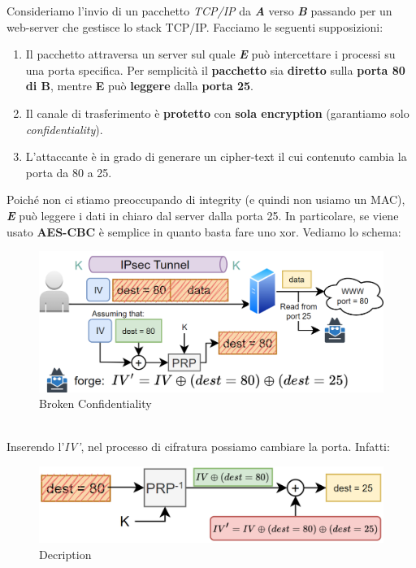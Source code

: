\begin{example}Consideriamo l'invio di un pacchetto \textit{TCP/IP} da \textit{\textbf{A}} verso \textit{\textbf{B}} passando per un web-server che gestisce lo stack TCP/IP. Facciamo le seguenti supposizioni: 
\begin{enumerate}
    \item Il pacchetto attraversa un server sul quale \textit{\textbf{E}} può intercettare i processi su una porta specifica. Per semplicità il \textbf{pacchetto} sia \textbf{diretto} sulla \textbf{porta 80 di B}, mentre \textbf{E} può \textbf{leggere} dalla \textbf{porta 25}. 
    \item Il canale di trasferimento è \textbf{protetto} con \textbf{sola encryption} (garantiamo solo \textit{confidentiality}).
    \item L'attaccante è in grado di generare un cipher-text il cui contenuto cambia la porta da 80 a 25. 
\end{enumerate}
Poiché non ci stiamo preoccupando di integrity (e quindi non usiamo un MAC), \textit{\textbf{E}} può leggere i dati in chiaro dal server dalla porta 25. In particolare, se viene usato \textbf{AES-CBC} è semplice in quanto basta fare uno xor. Vediamo lo schema:
\begin{figure}[h]
    \centering
    \includegraphics{image/portredirect.png}
    \caption{Broken Confidentiality}
    \label{fig:portredirect}
\end{figure}\\
Inserendo l'\textit{IV'}, nel processo di cifratura possiamo cambiare la porta. Infatti:
\begin{figure}[ht]
    \centering
    \includegraphics{image/portredirectdec.png}
    \caption{Decription}
    \label{fig:decriptionport}
\end{figure}
\end{example}
